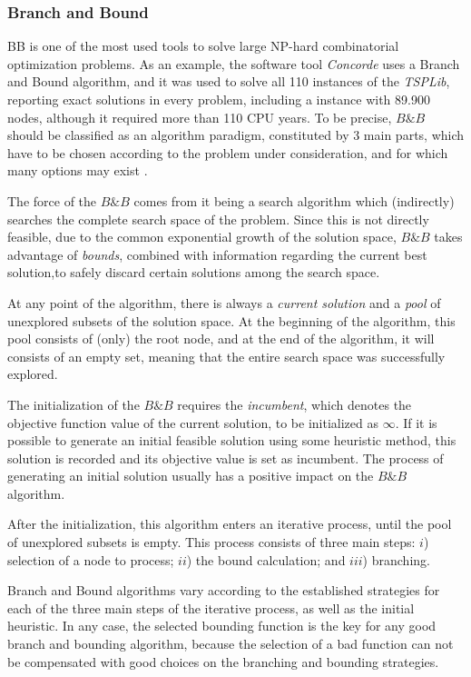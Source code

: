 \subsubsection{Branch and Bound}
\label{sec:bnb}

\ac{BB} is one of the most used tools to solve large NP-hard combinatorial optimization problems. As an example, the software tool \textit{Concorde} uses a Branch and Bound algorithm, and it was used to solve all 110 instances of the \textit{TSPLib}, reporting exact solutions in every problem, including a instance with 89.900 nodes, although it required more than 110 CPU years. To be precise, $B\&B$ should be classified as an algorithm paradigm, constituted by 3 main parts, which have to be chosen according to the problem under consideration, and for which many options may exist \cite{bnb}.

The force of the $B\&B$ comes from it being a search algorithm which (indirectly) searches the complete search space of the problem. Since this is not directly feasible, due to the common exponential growth of the solution space, $B\&B$ takes advantage of \textit{bounds}, combined with information regarding the current best solution,to safely discard certain solutions among the search space.

At any point of the algorithm, there is always a \textit{current solution} and a \textit{pool} of unexplored subsets of the solution space. At the beginning of the algorithm, this pool consists of (only) the root node, and at the end of the algorithm, it will consists of an empty set, meaning that the entire search space was successfully explored. 

The initialization of the $B\&B$ requires the \textit{incumbent}, which denotes the objective function value of the current solution, to be initialized as $\infty$. If it is possible to generate an initial feasible solution using some heuristic method, this solution is recorded and its objective value is set as incumbent. The process of generating an initial solution usually has a positive impact on the $B\&B$ algorithm. 

After the initialization, this algorithm enters an iterative process, until the pool of unexplored subsets is empty. This process consists of three main steps: $i$) selection of a node to process; $ii$) the bound calculation; and $iii$) branching.

Branch and Bound algorithms vary according to the established strategies for each of the three main steps of the iterative process, as well as the initial heuristic. In any case, the selected bounding function is the key for any good branch and bounding algorithm, because the selection of a bad function can not be compensated with good choices on the branching and bounding strategies. 

